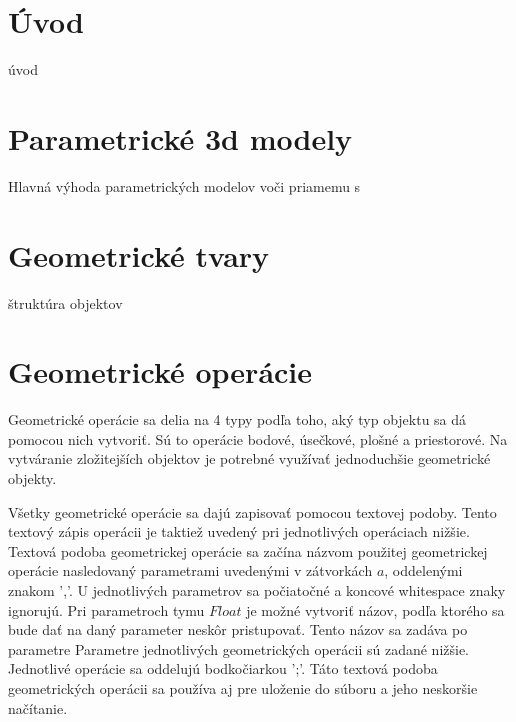 \usepackage{todonotes}

\chapter{Úvod}
úvod

\chapter{Parametrické 3d modely}
Hlavná výhoda parametrických modelov voči priamemu  s



\chapter{Geometrické tvary}
\label{chapt:Geometrické_tvary}
štruktúra objektov



\chapter{Geometrické operácie}
Geometrické operácie sa delia na 4 typy podľa toho, aký typ objektu sa dá pomocou nich vytvoriť. Sú to operácie bodové, úsečkové, plošné a priestorové. Na vytváranie zložitejších objektov je potrebné využívať jednoduchšie geometrické objekty. 

Všetky geometrické operácie sa dajú zapisovať pomocou textovej podoby. Tento textový zápis operácii je taktiež uvedený pri jednotlivých operáciach nižšie. 
Textová podoba geometrickej operácie sa začína názvom použitej geometrickej operácie nasledovaný parametrami uvedenými v zátvorkách \( a \), oddelenými znakom ','.  U jednotlivých parametrov sa počiatočné a koncové whitespace znaky ignorujú.
Pri parametroch tymu $Float$ je možné vytvoriť názov, podľa ktorého sa bude dať na daný parameter neskôr pristupovať. 
Tento názov sa zadáva po parametre 
Parametre jednotlivých geometrických operácii sú zadané nižšie. 
Jednotlivé operácie sa oddelujú bodkočiarkou ';'. 
Táto textová podoba geometrických operácii sa používa aj pre uloženie do súboru a jeho neskoršie načítanie. 

